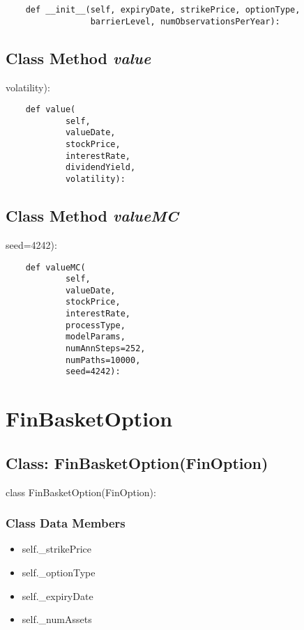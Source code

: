 \documentclass[twoside,11pt]{book}
\begin{document}
\begin{lstlisting}
    def __init__(self, expiryDate, strikePrice, optionType,
                 barrierLevel, numObservationsPerYear):
\end{lstlisting}

\subsection{Class Method {\it value}}
volatility):

\begin{lstlisting}
    def value(
            self,
            valueDate,
            stockPrice,
            interestRate,
            dividendYield,
            volatility):
\end{lstlisting}

\subsection{Class Method {\it valueMC}}
seed=4242):

\begin{lstlisting}
    def valueMC(
            self,
            valueDate,
            stockPrice,
            interestRate,
            processType,
            modelParams,
            numAnnSteps=252,
            numPaths=10000,
            seed=4242):
\end{lstlisting}

\newpage
\section{FinBasketOption}

\subsection{Class: FinBasketOption(FinOption)}
class FinBasketOption(FinOption):

\subsubsection{Class Data Members}
\begin{itemize}
\item{self.\_strikePrice}
\item{self.\_optionType}
\item{self.\_expiryDate}
\item{self.\_numAssets}
\end{itemize}
\end{document}
